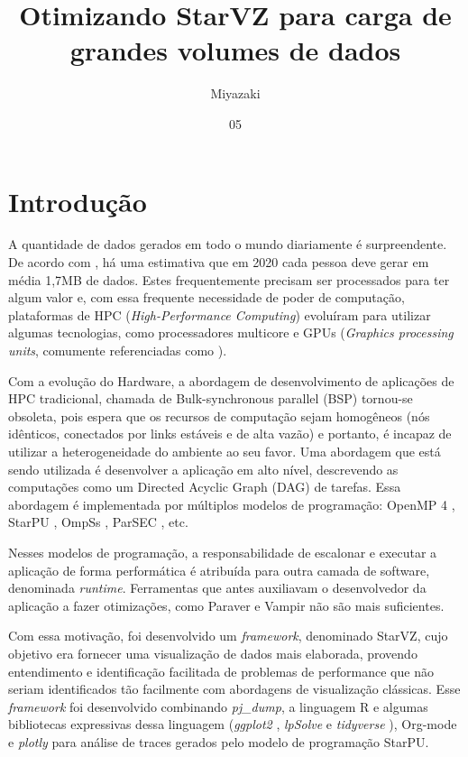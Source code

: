 \documentclass[prop-esp]{iiufrgs}
\title{Otimizando StarVZ para carga de grandes volumes de dados}
\author{Miyazaki}{Alexandre K. S.}
\date{05}{2019}
\begin{document}
\maketitle      



%
\chapter{Introdução} \label{intro}

A quantidade de dados gerados em todo o mundo diariamente é surpreendente. De acordo com \cite{ref:data_minute2}, há uma estimativa
que em 2020 cada pessoa deve gerar em média 1,7MB de dados. Estes frequentemente precisam ser processados para ter algum valor e,
com essa frequente necessidade de poder de computação, plataformas de HPC (\emph{High-Performance Computing}) evoluíram para utilizar algumas
tecnologias, como processadores multicore e GPUs (\emph{Graphics processing units}, comumente referenciadas como ).

Com a evolução do Hardware, a abordagem de desenvolvimento de aplicações de HPC tradicional, chamada de Bulk-synchronous parallel (BSP) tornou-se 
obsoleta, pois espera que os recursos de computação sejam homogêneos (nós idênticos, conectados por links estáveis e de alta vazão) e portanto, é incapaz de utilizar a heterogeneidade do ambiente ao seu favor. Uma abordagem que está sendo utilizada é desenvolver a aplicação em alto nível, descrevendo as computações como um Directed Acyclic Graph (DAG) de tarefas. Essa abordagem é implementada por múltiplos modelos de programação: OpenMP 4 \cite{ref:openmp4}, StarPU \cite{ref:starpu}, OmpSs \cite{ref:ompss}, ParSEC \cite{ref:parsec}, etc. 

Nesses modelos de programação, a responsabilidade de escalonar e executar a aplicação de forma performática é atribuída para outra camada de software, denominada \emph{runtime}. Ferramentas que antes auxiliavam o desenvolvedor da aplicação a fazer otimizações, como Paraver \cite{ref:paraver} e Vampir \cite{ref:vampir} não são mais suficientes.

Com essa motivação, foi desenvolvido um \emph{framework}, denominado StarVZ, cujo objetivo era fornecer uma visualização de dados mais elaborada, provendo entendimento e identificação facilitada de problemas de performance que não seriam identificados tão facilmente com abordagens de visualização clássicas. Esse \emph{framework} foi desenvolvido combinando \emph{pj\_dump},  a linguagem R \cite{ref:rlanguage} e algumas bibliotecas expressivas dessa linguagem (\emph{ggplot2} \cite{ref:ggplot2}, \emph{lpSolve} \cite{ref:lpsolve} e \emph{tidyverse} \cite{ref:tidyverse}), Org-mode \cite{ref:org-mode} e \emph{plotly} para análise de traces gerados pelo modelo de programação StarPU.
\end{document}
